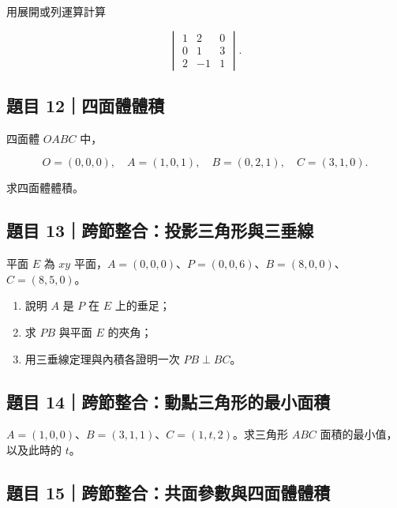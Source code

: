 \documentclass[11pt,a4paper]{article}
\providecommand{\tightlist}{%
  \setlength{\itemsep}{0pt}\setlength{\parskip}{0pt}}
\begin{document}
用展開或列運算計算

\[
\begin{vmatrix}
1&2&0\\
0&1&3\\
2&-1&1
\end{vmatrix}.
\]

\subsection{題目 12｜四面體體積}\label{ux984cux76ee-12ux56dbux9762ux9ad4ux9ad4ux7a4d}

四面體 \(OABC\) 中，

\[
O=(0,0,0),\quad A=(1,0,1),\quad B=(0,2,1),\quad C=(3,1,0).
\]

求四面體體積。

\subsection{題目 13｜跨節整合：投影三角形與三垂線}\label{ux984cux76ee-13ux8de8ux7bc0ux6574ux5408ux6295ux5f71ux4e09ux89d2ux5f62ux8207ux4e09ux5782ux7dda}

平面 \(E\) 為 \(xy\) 平面，\(A=(0,0,0)\)、\(P=(0,0,6)\)、\(B=(8,0,0)\)、\(C=(8,5,0)\)。

\begin{enumerate}
\def\labelenumi{\arabic{enumi}.}
\tightlist
\item
  說明 \(A\) 是 \(P\) 在 \(E\) 上的垂足；
\item
  求 \(PB\) 與平面 \(E\) 的夾角；
\item
  用三垂線定理與內積各證明一次 \(PB\perp BC\)。
\end{enumerate}

\subsection{題目 14｜跨節整合：動點三角形的最小面積}\label{ux984cux76ee-14ux8de8ux7bc0ux6574ux5408ux52d5ux9edeux4e09ux89d2ux5f62ux7684ux6700ux5c0fux9762ux7a4d}

\(A=(1,0,0)\)、\(B=(3,1,1)\)、\(C=(1,t,2)\)。求三角形 \(ABC\) 面積的最小值，以及此時的 \(t\)。

\subsection{題目 15｜跨節整合：共面參數與四面體體積}\label{ux984cux76ee-15ux8de8ux7bc0ux6574ux5408ux5171ux9762ux53c3ux6578ux8207ux56dbux9762ux9ad4ux9ad4ux7a4d}
\end{document}

